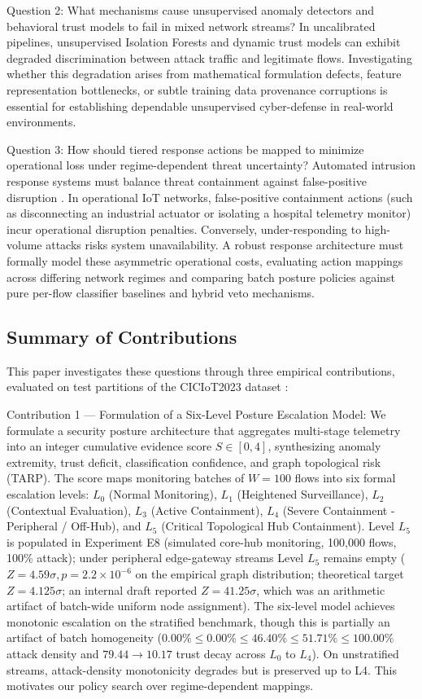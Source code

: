\documentclass[journal,10pt,onecolumn]{IEEEtran}
\begin{document}
Question 2: What mechanisms cause unsupervised anomaly detectors and behavioral trust models to fail in mixed network streams?
In uncalibrated pipelines, unsupervised Isolation Forests and dynamic trust models can exhibit degraded discrimination between attack traffic and legitimate flows. Investigating whether this degradation arises from mathematical formulation defects, feature representation bottlenecks, or subtle training data provenance corruptions is essential for establishing dependable unsupervised cyber-defense in real-world environments.

Question 3: How should tiered response actions be mapped to minimize operational loss under regime-dependent threat uncertainty?
Automated intrusion response systems must balance threat containment against false-positive disruption \cite{27}. In operational IoT networks, false-positive containment actions (such as disconnecting an industrial actuator or isolating a hospital telemetry monitor) incur operational disruption penalties. Conversely, under-responding to high-volume attacks risks system unavailability. A robust response architecture must formally model these asymmetric operational costs, evaluating action mappings across differing network regimes and comparing batch posture policies against pure per-flow classifier baselines and hybrid veto mechanisms.


\subsection{Summary of Contributions}
This paper investigates these questions through three empirical contributions, evaluated on test partitions of the CICIoT2023 dataset \cite{3}:

Contribution 1 — Formulation of a Six-Level Posture Escalation Model:
We formulate a security posture architecture that aggregates multi-stage telemetry into an integer cumulative evidence score $S \in [0, 4]$, synthesizing anomaly extremity, trust deficit, classification confidence, and graph topological risk (TARP). The score maps monitoring batches of $W=100$ flows into six formal escalation levels: $L_0$ (Normal Monitoring), $L_1$ (Heightened Surveillance), $L_2$ (Contextual Evaluation), $L_3$ (Active Containment), $L_4$ (Severe Containment - Peripheral / Off-Hub), and $L_5$ (Critical Topological Hub Containment). Level $L_5$ is populated in Experiment E8 (simulated core-hub monitoring, 100,000 flows, 100\% attack); under peripheral edge-gateway streams Level $L_5$ remains empty ($Z = 4.59\sigma, p = 2.2 \times 10^{-6}$ on the empirical graph distribution; theoretical target $Z = 4.125\sigma$; an internal draft reported $Z = 41.25\sigma$, which was an arithmetic artifact of batch-wide uniform node assignment). The six-level model achieves monotonic escalation on the stratified benchmark, though this is partially an artifact of batch homogeneity ($0.00\% \le 0.00\% \le 46.40\% \le 51.71\% \le 100.00\%$ attack density and $79.44 \to 10.17$ trust decay across $L_0$ to $L_4$). On unstratified streams, attack-density monotonicity degrades but is preserved up to L4. This motivates our policy search over regime-dependent mappings.
\end{document}
